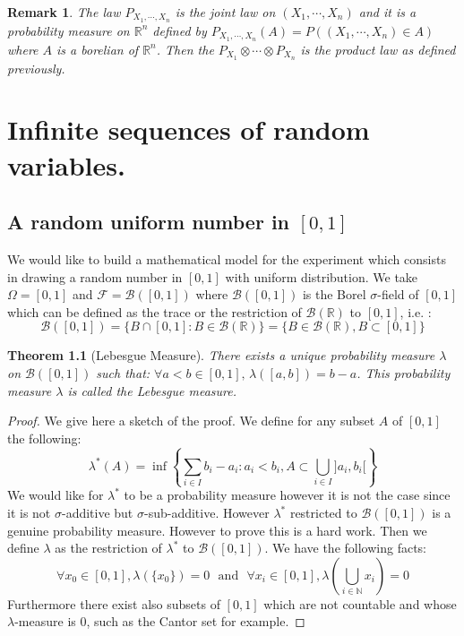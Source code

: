 \documentclass[10pt,a4paper]{book}
\newtheorem{theorem}{Theorem}[section]
\newtheorem*{remark}{Remark}
\theoremstyle{definition}
\begin{document}
\begin{remark}
The law $P_{X_1, \cdots, X_n}$ is the joint law on $(X_1, \cdots, X_n)$ and it is a probability measure on $\mathbb{R}^n$ defined by $P_{X_1, \cdots, X_n}(A) = P((X_1, \cdots, X_n) \in A)$ where $A$ is a borelian of $\mathbb{R}^n$. Then the $P_{X_1} \otimes \cdots \otimes P_{X_n}$ is the product law as defined previously.  
\end{remark}

\chapter{Infinite sequences of random variables.}

\section{A random uniform number in $[0, 1]$}
We would like to build a mathematical model for the experiment which consists in drawing a random number in $[0,1]$ with uniform distribution. We take $\Omega = [0, 1]$ and $\mathcal{F} = \mathcal{B}([0, 1])$ where $\mathcal{B}([0, 1])$ is the Borel $\sigma$-field of $[0, 1]$ which can be defined as the trace or the restriction of $\mathcal{B}(\mathbb{R})$ to $[0, 1]$, i.e. :
\[
\mathcal{B}([0, 1]) = \{ B \cap [0, 1] : B \in \mathcal{B}(\mathbb{R})\} = \{ B \in \mathcal{B}(\mathbb{R}), B \subset [0, 1]\}
\]

\begin{theorem} [Lebesgue Measure]
There exists a unique probability measure $\lambda$ on $\mathcal{B}([0,1])$ such that: $\forall a < b \in [0,1],\, \lambda([a,b]) = b- a$. This probability measure $\lambda$ is called the Lebesgue measure. 
\end{theorem}

\begin{proof}
We give here a sketch of the proof. We define for any subset $A$ of $[0, 1]$ the following:
\[
\lambda^*(A) = \inf \left\{ \sum_{i \in I} b_i - a_i : a_i < b_i, A \subset \bigcup_{i \in I} ]a_i, b_i[\right\}
\] 
We would like for $\lambda^*$ to be a probability measure however it is not the case since it is not $\sigma$-additive but $\sigma$-sub-additive. However $\lambda^*$ restricted to $\mathcal{B}([0, 1])$ is a genuine probability measure. However to prove this is a hard work. Then we define $\lambda$ as the restriction of $\lambda^*$ to $\mathcal{B}([0,1])$. We have the following facts:
\[
\forall x_0 \in [0, 1], \lambda(\{x_0\}) = 0 \mbox{~~and~~} \forall x_i \in [0,1], \lambda\left( \bigcup_{i \in \mathbb{N}} x_i \right) = 0
\]
Furthermore there exist also subsets of $[0,1]$ which are not countable and whose $\lambda$-measure is $0$, such as the Cantor set for example.
\end{proof}
\end{document}
